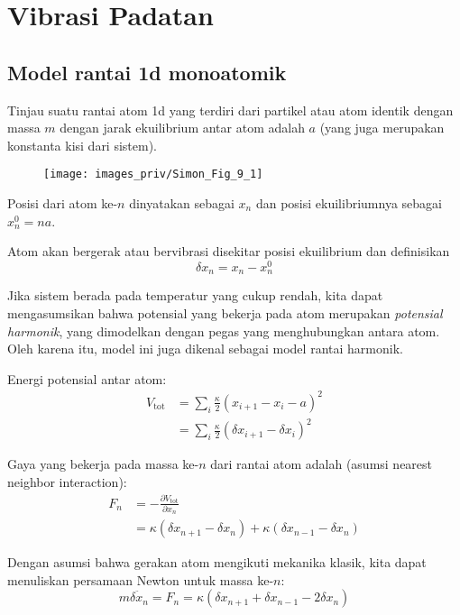 \chapter{Vibrasi Padatan}
\section{Model rantai 1d monoatomik}

Tinjau suatu rantai atom 1d yang terdiri dari partikel atau atom identik
dengan massa $m$ dengan jarak ekuilibrium antar atom adalah $a$
(yang juga merupakan konstanta kisi dari sistem).

\begin{figure}[h]
{\centering
\texttt{[image: images\_priv/Simon\_Fig\_9\_1]}
\par}
\end{figure}

Posisi dari atom ke-$n$ dinyatakan sebagai $x_{n}$ dan posisi
ekuilibriumnya sebagai $x^{0}_{n} = na$.

Atom akan bergerak atau bervibrasi disekitar posisi ekuilibrium dan
definisikan
\begin{equation*}
\delta x_{n} = x_{n} - x^{0}_{n}
\end{equation*}

Jika sistem berada pada temperatur yang cukup rendah, kita dapat
mengasumsikan bahwa potensial yang bekerja pada atom merupakan \textit{potensial
harmonik}, yang dimodelkan dengan pegas yang menghubungkan antara atom.
Oleh karena itu, model ini juga dikenal sebagai model rantai harmonik.

Energi potensial antar atom:
\begin{align*}
V_{\mathrm{tot}} & = \sum_{i} \frac{\kappa}{2} \left(
x_{i+1} - x_{i} - a \right)^2 \\
& = \sum_{i} \frac{\kappa}{2} \left(
\delta x_{i+1} - \delta x_{i} \right)^2
\end{align*}

Gaya yang bekerja pada massa ke-$n$ dari rantai atom adalah (asumsi
nearest neighbor interaction):
\begin{align*}
F_{n} & = -\frac{\partial V_{\mathrm{tot}}}{\partial x_{n}} \\
& = \kappa \left( \delta x_{n+1} - \delta x_{n} \right) +
\kappa \left( \delta x_{n-1} - \delta x_{n} \right)
\end{align*}

Dengan asumsi bahwa gerakan atom mengikuti mekanika klasik, kita dapat
menuliskan persamaan Newton untuk massa ke-$n$:
\begin{equation*}
m \ddot{\delta x_{n}} = F_{n} = \kappa \left(
    \delta x_{n+1} + \delta x_{n-1} - 2\delta x_{n}
    \right)    
\end{equation*}


